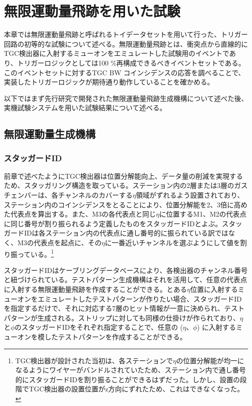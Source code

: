 \section{無限運動量飛跡を用いた試験}
\label{sec_IMT}

本章では無限運動量飛跡と呼ばれるトイデータセットを用いて行った、トリガー回路の初等的な試験について述べる。無限運動量飛跡とは、衝突点から直線的にTGC検出器に入射するミューオンをエミュレートした試験用のイベントであり、トリガーロジックとしては100 \%再構成できるべきイベントセットである。このイベントセットに対するTGC BW コインシデンスの応答を調べることで、実装したトリガーロジックが期待通り動作していることを確かめる。

以下ではまず先行研究で開発された無限運動量飛跡生成機構について述べた後、実機試験システムを用いた試験結果について述べる。

\subsection{無限運動量生成機構}
\label{subsec_IMT_generation}

\subsubsection{スタッガードID}
前章で述べたようにTGC検出器は位置分解能向上、データ量の削減を実現するため、スタッガリング構造を取っている。ステーション内の2層または3層のガスチェンバーは、各チャンネルのカバーする$\eta$領域がずれるよう設置されており、ステーション内のコインシデンスをとることにより、位置分解能を2、3倍に高めた代表点を算出する。また、M3の各代表点と同じ$\eta$に位置するM1、M2の代表点に同じ番号が割り振られるよう定義したものをスタッガードIDとよぶ。スタッガードIDは各ステーション内の代表点に通し番号的に振られている訳ではなく、M3の代表点を起点に、その$\eta$に一番近いチャンネルを選ぶようにして値を割り振っている。\footnote{TGC検出器が設計された当初は、各ステーションで$\eta$の位置分解能が均一になるようにワイヤーがバンドルされていたため、ステーション内で通し番号的にスタッガードIDを割り振ることができるはずだった。しかし、設置の段階でTGC検出器の設置位置がz方向にずれたため、これはできなくなった。}


スタッガードIDはケーブリングデータベースにより、各検出器のチャンネル番号と紐づけられている。テストパターン生成機構はそれを活用して、任意の代表点に入射する無限運動量飛跡を作成することができる。とある$\eta$位置に入射するミューオンをエミュレートしたテストパターンが作りたい場合、スタッガードIDを指定するだけで、それに対応する7層のヒット情報が一意に決められ、テストパターンが生成される。ストリップに対しても同様の仕掛けが作られており、$\eta$と$\phi$のスタッガードIDをそれぞれ指定することで、任意の ($\eta$、$\phi$) に入射するミューオンを模したテストパターンを作成することができる。


